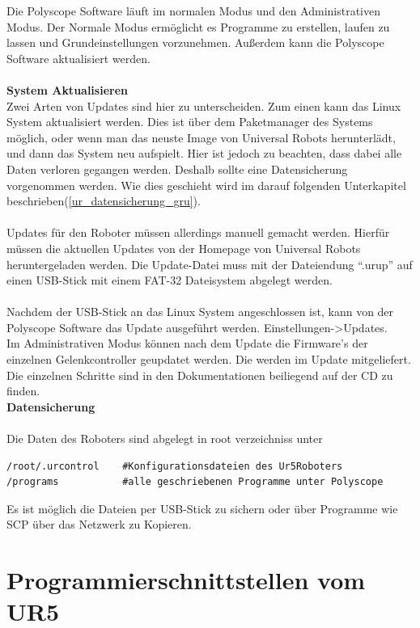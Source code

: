 Die Polyscope Software läuft im normalen Modus und den Administrativen Modus. Der Normale Modus ermöglicht es Programme zu erstellen, laufen zu lassen und Grundeinstellungen vorzunehmen. Außerdem kann die Polyscope Software aktualisiert werden.
\\\\
\textbf{System Aktualisieren}\\
Zwei Arten von Updates sind hier zu unterscheiden. Zum einen kann das Linux System aktualisiert werden. Dies ist über dem Paketmanager des Systems möglich, oder wenn man das neuste Image von Universal Robots herunterlädt, und dann das System neu aufspielt. Hier ist jedoch zu beachten, dass dabei alle Daten verloren gegangen werden. Deshalb sollte eine Datensicherung vorgenommen werden. Wie dies geschieht wird im darauf folgenden Unterkapitel beschrieben(\ref{ur_datensicherung_gru}).
\\\\
Updates für den Roboter müssen allerdings manuell gemacht werden. Hierfür müssen die aktuellen Updates von der Homepage von Universal Robots heruntergeladen werden. Die Update-Datei muss mit der Dateiendung ``.urup'' auf einen USB-Stick mit einem FAT-32 Dateisystem abgelegt werden.\\\\
Nachdem der USB-Stick an das Linux System angeschlossen ist, kann von der Polyscope Software das Update ausgeführt werden. Einstellungen->Updates.\\
Im Administrativen Modus können nach dem Update die Firmware's der einzelnen Gelenkcontroller geupdatet werden. Die werden im Update mitgeliefert. Die einzelnen Schritte sind in den Dokumentationen beiliegend auf der CD zu finden.\\
\newpage
\textbf{Datensicherung}
\\\\
Die Daten des Roboters sind abgelegt in root verzeichniss unter 

\begin{lstlisting}[caption={Pfade Der UR5 Relevanten Dateien}, label=lst:ur5data ,captionpos=b] 
/root/.urcontrol    #Konfigurationsdateien des Ur5Roboters
/programs   		#alle geschriebenen Programme unter Polyscope
\end{lstlisting}

Es ist möglich die Dateien per USB-Stick zu sichern oder über Programme wie \ac{SCP} über das Netzwerk zu Kopieren.

\section{Programmierschnittstellen vom UR5}
\label{sec:programm_api_uebersicht_gru}

